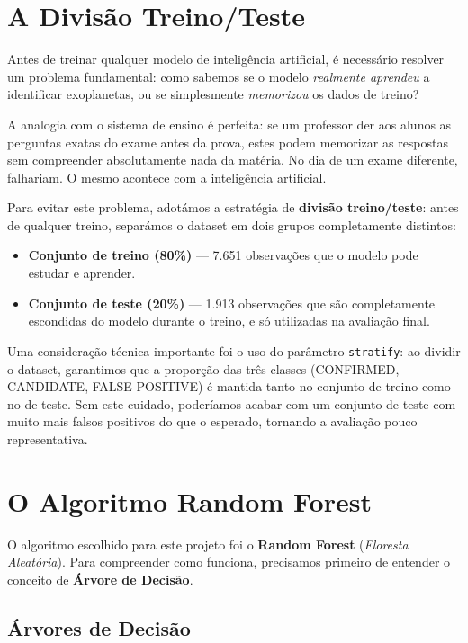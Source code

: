 \documentclass[12pt, a4paper]{report}
\begin{document}
\section{A Divisão Treino/Teste}

Antes de treinar qualquer modelo de inteligência artificial, é necessário resolver um problema fundamental: como sabemos se o modelo \textit{realmente aprendeu} a identificar exoplanetas, ou se simplesmente \textit{memorizou} os dados de treino?

A analogia com o sistema de ensino é perfeita: se um professor der aos alunos as perguntas exatas do exame antes da prova, estes podem memorizar as respostas sem compreender absolutamente nada da matéria. No dia de um exame diferente, falhariam. O mesmo acontece com a inteligência artificial.

Para evitar este problema, adotámos a estratégia de \textbf{divisão treino/teste}: antes de qualquer treino, separámos o dataset em dois grupos completamente distintos:

\begin{itemize}
    \item \textbf{Conjunto de treino (80\%)} — 7.651 observações que o modelo pode estudar e aprender.
    \item \textbf{Conjunto de teste (20\%)} — 1.913 observações que são completamente escondidas do modelo durante o treino, e só utilizadas na avaliação final.
\end{itemize}

Uma consideração técnica importante foi o uso do parâmetro \texttt{stratify}: ao dividir o dataset, garantimos que a proporção das três classes (CONFIRMED, CANDIDATE, FALSE POSITIVE) é mantida tanto no conjunto de treino como no de teste. Sem este cuidado, poderíamos acabar com um conjunto de teste com muito mais falsos positivos do que o esperado, tornando a avaliação pouco representativa.

\section{O Algoritmo Random Forest}

O algoritmo escolhido para este projeto foi o \textbf{Random Forest} (\textit{Floresta Aleatória}). Para compreender como funciona, precisamos primeiro de entender o conceito de \textbf{Árvore de Decisão}.

\subsection{Árvores de Decisão}
\end{document}
